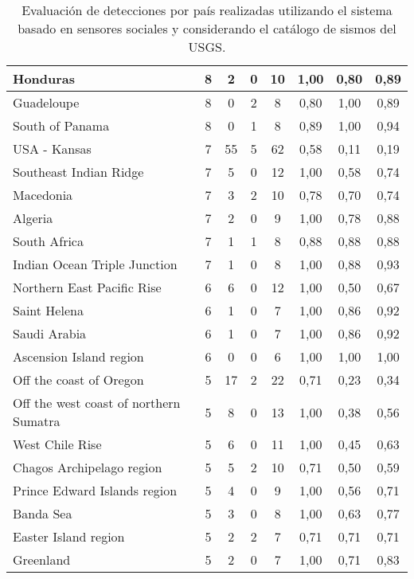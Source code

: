 {\begin{table}[!ht]
\begin{tabular}{|l|ccc|c|ccc|}
Honduras	 & 8 	 & 2 	 & 0   	& 10	 & 1,00 &	0,80 &	0,89 \\ \hline
Guadeloupe	 & 8 	 & 0   	 & 2 	& 8	 & 0,80 &	1,00 &	0,89 \\ \hline
South of Panama	 & 8 	 & 0   	 & 1 	& 8	 & 0,89 &	1,00 &	0,94 \\ \hline
USA - Kansas	 & 7 	 & 55 	 & 5 	& 62	 & 0,58 &	0,11 &	0,19 \\ \hline
Southeast Indian Ridge	 & 7 	 & 5 	 & 0   	& 12	 & 1,00 &	0,58 &	0,74 \\ \hline
Macedonia	 & 7 	 & 3 	 & 2 	& 10	 & 0,78 &	0,70 &	0,74 \\ \hline
Algeria	 & 7 	 & 2 	 & 0   	& 9	 & 1,00 &	0,78 &	0,88 \\ \hline
South Africa	 & 7 	 & 1 	 & 1 	& 8	 & 0,88 &	0,88 &	0,88 \\ \hline
Indian Ocean Triple Junction	 & 7 	 & 1 	 & 0   	& 8	 & 1,00 &	0,88 &	0,93 \\ \hline
Northern East Pacific Rise	 & 6 	 & 6 	 & 0   	& 12	 & 1,00 &	0,50 &	0,67 \\ \hline
Saint Helena	 & 6 	 & 1 	 & 0   	& 7	 & 1,00 &	0,86 &	0,92 \\ \hline
Saudi Arabia	 & 6 	 & 1 	 & 0   	& 7	 & 1,00 &	0,86 &	0,92 \\ \hline
Ascension Island region	 & 6 	 & 0   	 & 0   	& 6	 & 1,00 &	1,00 &	1,00 \\ \hline
Off the coast of Oregon	 & 5 	 & 17 	 & 2 	& 22	 & 0,71 &	0,23 &	0,34 \\ \hline
Off the west coast of northern Sumatra	 & 5 	 & 8 	 & 0   	& 13	 & 1,00 &	0,38 &	0,56 \\ \hline
West Chile Rise	 & 5 	 & 6 	 & 0   	& 11	 & 1,00 &	0,45 &	0,63 \\ \hline
Chagos Archipelago region	 & 5 	 & 5 	 & 2 	& 10	 & 0,71 &	0,50 &	0,59 \\ \hline
Prince Edward Islands region	 & 5 	 & 4 	 & 0   	& 9	 & 1,00 &	0,56 &	0,71 \\ \hline
Banda Sea	 & 5 	 & 3 	 & 0   	& 8	 & 1,00 &	0,63 &	0,77 \\ \hline
Easter Island region	 & 5 	 & 2 	 & 2 	& 7	 & 0,71 &	0,71 &	0,71 \\ \hline
Greenland	 & 5 	 & 2 	 & 0   	& 7	 & 1,00 &	0,71 &	0,83 \\ \hline
   \end{tabular}
  \caption{Evaluación de detecciones por país realizadas utilizando el sistema basado en sensores sociales y considerando el catálogo de sismos del USGS.}
  \label{table:all-detections-03}
\end{table}}

